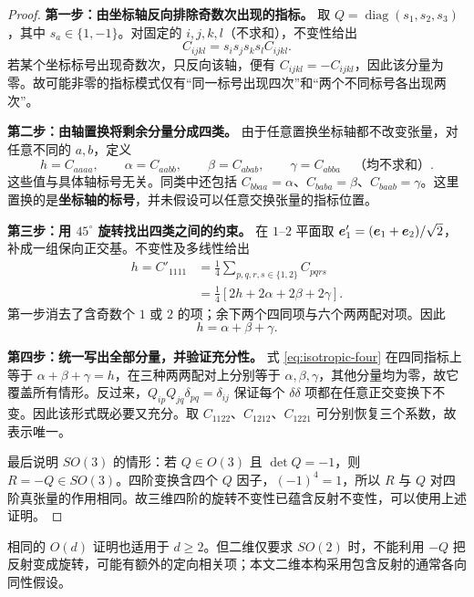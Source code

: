 \begin{proof}
\textbf{第一步：由坐标轴反向排除奇数次出现的指标。}
取 $Q=\operatorname{diag}(s_1,s_2,s_3)$，其中 $s_a\in\{1,-1\}$。对固定的 $i,j,k,l$（不求和），不变性给出
\begin{equation}
 C_{ijkl}=s_is_js_ks_l C_{ijkl}.
\end{equation}
若某个坐标标号出现奇数次，只反向该轴，便有 $C_{ijkl}=-C_{ijkl}$，因此该分量为零。故可能非零的指标模式仅有“同一标号出现四次”和“两个不同标号各出现两次”。

\textbf{第二步：由轴置换将剩余分量分成四类。}
由于任意置换坐标轴都不改变张量，对任意不同的 $a,b$，定义
\begin{equation}
 h=C_{aaaa},\qquad
 \alpha=C_{aabb},\qquad
 \beta=C_{abab},\qquad
 \gamma=C_{abba}\quad\text{（均不求和）}.
\end{equation}
这些值与具体轴标号无关。同类中还包括 $C_{bbaa}=\alpha$、$C_{baba}=\beta$、$C_{baab}=\gamma$。这里置换的是\textbf{坐标轴的标号}，并未假设可以任意交换张量的指标位置。

\textbf{第三步：用 $45^\circ$ 旋转找出四类之间的约束。}
在 $1$--$2$ 平面取 $\bm{e}'_1=(\bm{e}_1+\bm{e}_2)/\sqrt2$，补成一组保向正交基。不变性及多线性给出
\begin{align}
 h=C'_{1111}
 &=\frac14\sum_{p,q,r,s\in\{1,2\}}C_{pqrs}\\
 &=\frac14[2h+2\alpha+2\beta+2\gamma].
\end{align}
第一步消去了含奇数个 $1$ 或 $2$ 的项；余下两个四同项与六个两两配对项。因此
\begin{equation}
 h=\alpha+\beta+\gamma.\label{eq:isotropic-four-diagonal}
\end{equation}

\textbf{第四步：统一写出全部分量，并验证充分性。}
式 \eqref{eq:isotropic-four} 在四同指标上等于 $\alpha+\beta+\gamma=h$，在三种两两配对上分别等于 $\alpha,\beta,\gamma$，其他分量均为零，故它覆盖所有情形。反过来，$Q_{ip}Q_{jq}\delta_{pq}=\delta_{ij}$ 保证每个 $\delta\delta$ 项都在任意正交变换下不变。因此该形式既必要又充分。取 $C_{1122}$、$C_{1212}$、$C_{1221}$ 可分别恢复三个系数，故表示唯一。

最后说明 $SO(3)$ 的情形：若 $Q\in O(3)$ 且 $\det Q=-1$，则 $R=-Q\in SO(3)$。四阶变换含四个 $Q$ 因子，$(-1)^4=1$，所以 $R$ 与 $Q$ 对四阶真张量的作用相同。故三维四阶的旋转不变性已蕴含反射不变性，可以使用上述证明。
\end{proof}

相同的 $O(d)$ 证明也适用于 $d\ge2$。但二维仅要求 $SO(2)$ 时，不能利用 $-Q$ 把反射变成旋转，可能有额外的定向相关项；本文二维本构采用包含反射的通常各向同性假设。

